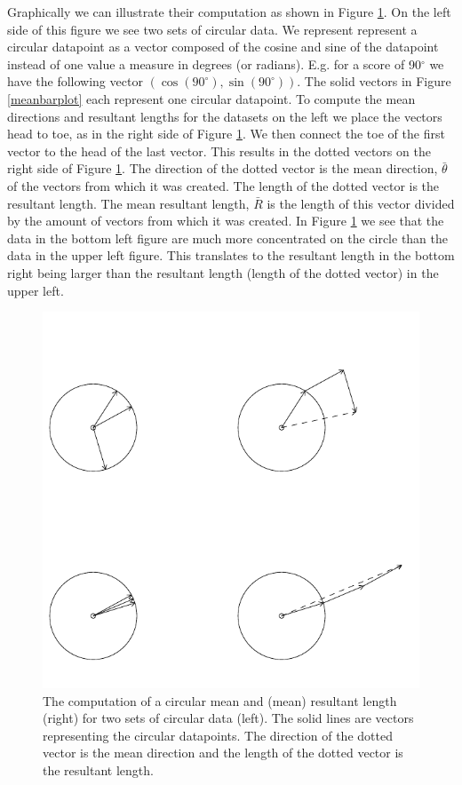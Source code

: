 \documentclass[11pt,]{article}
\begin{document}
Graphically we can illustrate their computation as shown in Figure
\ref{meanrbarplot}. On the left side of this figure we see two sets of
circular data. We represent represent a circular datapoint as a vector
composed of the cosine and sine of the datapoint instead of one value a
measure in degrees (or radians). E.g. for a score of 90\(^\circ\) we
have the following vector \((\cos(90^\circ), \sin(90^\circ))\). The
solid vectors in Figure \ref{meanbarplot} each represent one circular
datapoint. To compute the mean directions and resultant lengths for the
datasets on the left we place the vectors head to toe, as in the right
side of Figure \ref{meanrbarplot}. We then connect the toe of the first
vector to the head of the last vector. This results in the dotted
vectors on the right side of Figure \ref{meanrbarplot}. The direction of
the dotted vector is the mean direction, \(\bar{\theta}\) of the vectors
from which it was created. The length of the dotted vector is the
resultant length. The mean resultant length, \(\bar{R}\) is the length
of this vector divided by the amount of vectors from which it was
created. In Figure \ref{meanrbarplot} we see that the data in the bottom
left figure are much more concentrated on the circle than the data in
the upper left figure. This translates to the resultant length in the
bottom right being larger than the resultant length (length of the
dotted vector) in the upper left.

\begin{figure}
        \centering

\includegraphics[width=\textwidth]{meanrbar.pdf}

         \caption{The computation of a circular mean and (mean) resultant length (right) for two sets of circular data (left). The solid lines are vectors representing the circular datapoints. The direction of the dotted vector is the mean direction and the length of the dotted vector is the resultant length.}
        \label{meanrbarplot}
\end{figure}
\end{document}
